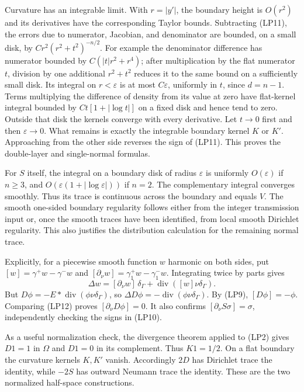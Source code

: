 \documentclass[
  11pt,
]{article}
\begin{document}
Curvature has an integrable limit. With \(r=|y'|\), the boundary height
is \(O(r^2)\) and its derivatives have the corresponding Taylor bounds.
Subtracting (LP11), the errors due to numerator, Jacobian, and
denominator are bounded, on a small disk, by \(C r^2(r^2+t^2)^{-n/2}\).
For example the denominator difference has numerator bounded by
\(C(|t|r^2+r^4)\); after multiplication by the flat numerator \(t\),
division by one additional \(r^2+t^2\) reduces it to the same bound on a
sufficiently small disk. Its integral on \(r<\varepsilon\) is at most
\(C\varepsilon\), uniformly in \(t\), since \(d=n-1\). Terms multiplying
the difference of density from its value at zero have flat-kernel
integral bounded by \(C t[1+|\log t|]\) on a fixed disk and hence tend
to zero. Outside that disk the kernels converge with every derivative.
Let \(t\to0\) first and then \(\varepsilon\to0\). What remains is
exactly the integrable boundary kernel \(K\) or \(K'\). Approaching from
the other side reverses the sign of (LP11). This proves the double-layer
and single-normal formulas.

For \(S\) itself, the integral on a boundary disk of radius
\(\varepsilon\) is uniformly \(O(\varepsilon)\) if \(n\ge3\), and
\(O(\varepsilon(1+|\log\varepsilon|))\) if \(n=2\). The complementary
integral converges smoothly. Thus its trace is continuous across the
boundary and equals \(V\). The smooth one-sided boundary regularity
follows either from the integer transmission input or, once the smooth
traces have been identified, from local smooth Dirichlet regularity.
This also justifies the distribution calculation for the remaining
normal trace.

Explicitly, for a piecewise smooth function \(w\) harmonic on both
sides, put \([w]=\gamma^+w-\gamma^-w\) and
\([\partial_\nu w]=\gamma_1^+w-\gamma_1^-w\). Integrating twice by parts
gives \[
 \Delta w=[\partial_\nu w]\,\delta_\Gamma
             +\operatorname{div}([w]\nu\delta_\Gamma).
 \tag{LP12}
\] But \(D\phi=-E*\operatorname{div}(\phi\nu\delta_\Gamma)\), so
\(\Delta D\phi=-\operatorname{div}(\phi\nu\delta_\Gamma)\). By (LP9),
\([D\phi]=-\phi\). Comparing (LP12) proves \([\partial_\nu D\phi]=0\).
It also confirms \([\partial_\nu S\sigma]=\sigma\), independently
checking the signs in (LP10).

As a useful normalization check, the divergence theorem applied to (LP2)
gives \(D1=1\) in \(\Omega\) and \(D1=0\) in its complement. Thus
\(K1=1/2\). On a flat boundary the curvature kernels \(K,K'\) vanish.
Accordingly \(2D\) has Dirichlet trace the identity, while \(-2S\) has
outward Neumann trace the identity. These are the two normalized
half-space constructions.
\end{document}
